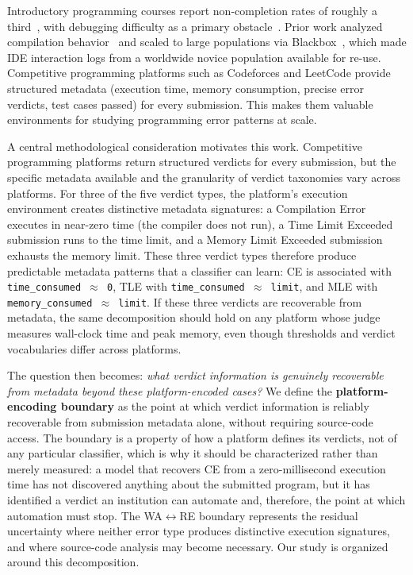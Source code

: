 \documentclass[acmsmall]{acmart}
\begin{document}
Introductory programming courses report non-completion rates of roughly a
third~\cite{bennedsen2007failure,watson2014failure}, with debugging difficulty as a primary obstacle~\cite{watson2014failure,spohrer1986novice}. Prior work analyzed compilation behavior~\cite{jadud2006methods} and scaled to
large populations via Blackbox~\cite{brown2014blackbox}, which made
IDE interaction logs from a worldwide novice population available for re-use. Competitive programming platforms such as Codeforces and LeetCode provide structured metadata (execution time, memory consumption, precise error verdicts, test cases passed) for every submission. This makes them valuable environments for studying programming error patterns at scale.

A central methodological consideration motivates this work. Competitive
programming platforms return structured verdicts for every submission, but the
specific metadata available and the granularity of verdict taxonomies vary across
platforms. For three of the five verdict types, the platform's execution
environment creates distinctive metadata signatures: a Compilation Error executes
in near-zero time (the compiler does not run), a Time Limit Exceeded submission
runs to the time limit, and a Memory Limit Exceeded submission exhausts the memory
limit. These three verdict types therefore produce predictable metadata patterns
that a classifier can learn: CE is associated with \texttt{time\_consumed $\approx$ 0},
TLE with \texttt{time\_consumed $\approx$ limit}, and MLE with \texttt{memory\_consumed $\approx$ limit}.
If these three verdicts are recoverable from metadata, the same decomposition
should hold on any platform whose judge measures wall-clock time and peak memory,
even though thresholds and verdict vocabularies differ across platforms.

The question then becomes: \emph{what verdict information is genuinely
recoverable from metadata beyond these platform-encoded cases?}
We define the \textbf{platform-encoding boundary} as the point at which verdict
information is reliably recoverable from submission metadata alone, without
requiring source-code access. The boundary is a property of how a platform
defines its verdicts, not of any particular classifier, which is why it should be
characterized rather than merely measured: a model that recovers CE from a
zero-millisecond execution time has not discovered anything about the submitted
program, but it has identified a verdict an institution can automate and,
therefore, the point at which automation must stop. The WA$\leftrightarrow$RE
boundary represents the residual uncertainty where neither error type produces
distinctive execution signatures, and where source-code analysis may become
necessary. Our study is organized around this decomposition.
\end{document}
